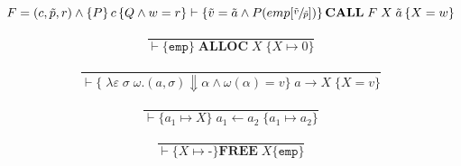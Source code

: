 \begin{equation}
F = (c,\tilde{p},r) \wedge \left\{P\right\} c \left\{Q \wedge w = r\right\} \vdash \left\{\tilde{v} = \tilde{a} \wedge P(emp[\sfrac{\tilde{v}}{\tilde{p}}])\right\}\textbf{CALL} \; F \; X \; \tilde{a} \left\{X = w\right\}
\end{equation}

\begin{equation}
\frac
{}
{\vdash \{ \texttt{emp} \}\; \textbf{ALLOC}\; X \;\{X \mapsto 0\}}
\end{equation}

\begin{equation}
\frac{}
{\vdash \{\; \lambda\varepsilon\;\sigma\;\omega.(a,\sigma)\Downarrow\alpha \wedge \omega(\alpha) = v\}\; a \rightarrow X \;\{ X = v \}}
\end{equation}

\begin{equation}
\frac{}
{\vdash \{ a_1 \mapsto X \}\; a_1 \leftarrow a_2 \;\{ a_1 \mapsto a_2 \}}
\end{equation}

\begin{equation}
\frac{}
{\vdash \{X \mapsto \textbf{-}\}\textbf{FREE}\;X \{\texttt{emp} \}}
\end{equation}